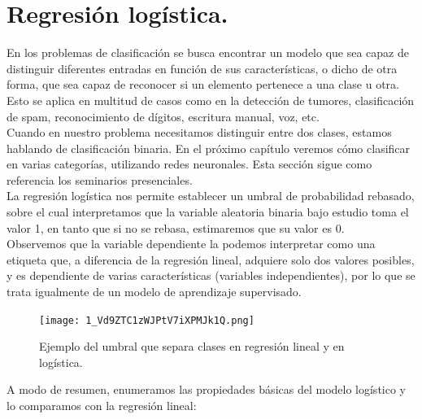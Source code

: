 \documentclass[a4paper,11pt]{article}
\begin{document}
\section{Regresión logística.}
En los problemas de clasificación se busca encontrar un modelo que sea capaz de distinguir diferentes entradas en función de sus características, o dicho de otra forma, que sea capaz de reconocer si un elemento pertenece a una clase u otra. Esto se aplica
en multitud de casos como en la detección de tumores, clasificación de spam,
reconocimiento de dígitos, escritura manual, voz, etc.\\


\noindent
Cuando en nuestro problema necesitamos distinguir entre dos clases, estamos hablando de clasificación binaria. En el próximo
capítulo veremos cómo clasificar en varias categorías, utilizando redes neuronales. Esta sección sigue como referencia los seminarios presenciales.\\

\noindent
La regresión logística nos permite establecer un umbral de probabilidad rebasado, sobre el cual interpretamos que la variable aleatoria binaria bajo estudio toma el valor
1, en tanto que si no se rebasa, estimaremos que su valor es 0.\\

\noindent
Observemos que la variable dependiente la podemos interpretar como una etiqueta que, a diferencia de la regresión lineal, adquiere solo dos valores posibles,
y es dependiente de varias características (variables independientes), por lo que
se trata igualmente de un modelo de aprendizaje supervisado.

\begin{figure}[H]
\centering
\texttt{[image: 1\_Vd9ZTC1zWJPtV7iXPMJk1Q.png]}
\caption{Ejemplo del umbral que separa clases en regresión lineal y en logística.}
\end{figure}
\noindent
A modo de resumen, enumeramos las propiedades básicas del modelo logístico y lo comparamos con la regresión lineal:
\end{document}
